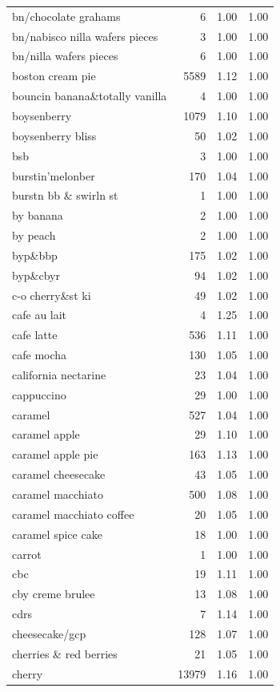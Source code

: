 \begin{table}
\begin{tabular}{lrrr}
bn/chocolate grahams & 6 & 1.00 & 1.00 \\
bn/nabisco nilla wafers pieces & 3 & 1.00 & 1.00 \\
bn/nilla wafers pieces & 6 & 1.00 & 1.00 \\
boston cream pie & 5589 & 1.12 & 1.00 \\
bouncin banana\&totally vanilla & 4 & 1.00 & 1.00 \\
boysenberry & 1079 & 1.10 & 1.00 \\
boysenberry bliss & 50 & 1.02 & 1.00 \\
bsb & 3 & 1.00 & 1.00 \\
burstin'melonber & 170 & 1.04 & 1.00 \\
burstn bb \& swirln st & 1 & 1.00 & 1.00 \\
by banana & 2 & 1.00 & 1.00 \\
by peach & 2 & 1.00 & 1.00 \\
byp\&bbp & 175 & 1.02 & 1.00 \\
byp\&cbyr & 94 & 1.02 & 1.00 \\
c-o cherry\&st ki & 49 & 1.02 & 1.00 \\
cafe au lait & 4 & 1.25 & 1.00 \\
cafe latte & 536 & 1.11 & 1.00 \\
cafe mocha & 130 & 1.05 & 1.00 \\
california nectarine & 23 & 1.04 & 1.00 \\
cappuccino & 29 & 1.00 & 1.00 \\
caramel & 527 & 1.04 & 1.00 \\
caramel apple & 29 & 1.10 & 1.00 \\
caramel apple pie & 163 & 1.13 & 1.00 \\
caramel cheesecake & 43 & 1.05 & 1.00 \\
caramel macchiato & 500 & 1.08 & 1.00 \\
caramel macchiato coffee & 20 & 1.05 & 1.00 \\
caramel spice cake & 18 & 1.00 & 1.00 \\
carrot & 1 & 1.00 & 1.00 \\
cbc & 19 & 1.11 & 1.00 \\
cby creme brulee & 13 & 1.08 & 1.00 \\
cdrs & 7 & 1.14 & 1.00 \\
cheesecake/gcp & 128 & 1.07 & 1.00 \\
cherries \& red berries & 21 & 1.05 & 1.00 \\
cherry & 13979 & 1.16 & 1.00 \\

\end{tabular}
\end{table}
